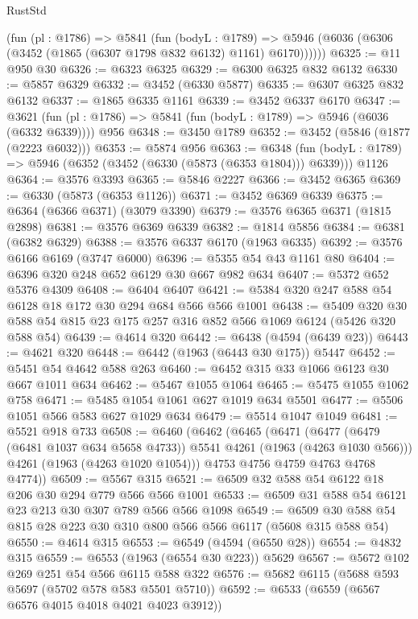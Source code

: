 \begin{lexlean}{RustStd}
\begin{coremodule}
      (fun (pl : @1786) =>
      @5841
        (fun (bodyL : @1789) =>
        @5946 (@6036 (@6306 (@3452 (@1865 (@6307 @1798 @832 @6132) @1161) @6170))))))
@6325 := @11 @950 @30
@6326 := @6323 @6325
@6329 := @6300 @6325 @832 @6132
@6330 := @5857 @6329
@6332 := @3452 (@6330 @5877)
@6335 := @6307 @6325 @832 @6132
@6337 := @1865 @6335 @1161
@6339 := @3452 @6337 @6170
@6347 := @3621 (fun (pl : @1786) => @5841 (fun (bodyL : @1789) => @5946 (@6036 (@6332 @6339)))) @956
@6348 := @3450 @1789
@6352 := @3452 (@5846 (@1877 (@2223 @6032)))
@6353 := @5874 @956
@6363 := @6348
    (fun (bodyL : @1789) => @5946 (@6352 (@3452 (@6330 (@5873 (@6353 @1804))) @6339)))
    @1126
@6364 := @3576 @3393
@6365 := @5846 @2227
@6366 := @3452 @6365
@6369 := @6330 (@5873 (@6353 @1126))
@6371 := @3452 @6369 @6339
@6375 := @6364 (@6366 @6371) (@3079 @3390)
@6379 := @3576 @6365 @6371 (@1815 @2898)
@6381 := @3576 @6369 @6339
@6382 := @1814 @5856
@6384 := @6381 (@6382 @6329)
@6388 := @3576 @6337 @6170 (@1963 @6335)
@6392 := @3576 @6166 @6169 (@3747 @6000)
@6396 := @5355 @54 @43 @1161 @80
@6404 := @6396 @320 @248 @652 @6129 @30 @667 @982 @634
@6407 := @5372 @652 @5376 @4309
@6408 := @6404 @6407
@6421 := @5384 @320 @247 @588 @54 @6128 @18 @172 @30 @294 @684 @566 @566 @1001
@6438 := @5409 @320 @30 @588 @54 @815 @23 @175 @257 @316 @852 @566 @1069 @6124 (@5426 @320 @588 @54)
@6439 := @4614 @320
@6442 := @6438 (@4594 (@6439 @23))
@6443 := @4621 @320
@6448 := @6442 (@1963 (@6443 @30 @175)) @5447
@6452 := @5451 @54 @4642 @588 @263
@6460 := @6452 @315 @33 @1066 @6123 @30 @667 @1011 @634
@6462 := @5467 @1055 @1064
@6465 := @5475 @1055 @1062 @758
@6471 := @5485 @1054 @1061 @627 @1019 @634 @5501
@6477 := @5506 @1051 @566 @583 @627 @1029 @634
@6479 := @5514 @1047 @1049
@6481 := @5521 @918 @733
@6508 := @6460
    (@6462
      (@6465
        (@6471
          (@6477 (@6479 (@6481 @1037 @634 @5658 @4733)) @5541 @4261 (@1963 (@4263 @1030 @566)))
          @4261
          (@1963 (@4263 @1020 @1054)))
        @4753
        @4756
        @4759
        @4763
        @4768
        @4774))
@6509 := @5567 @315
@6521 := @6509 @32 @588 @54 @6122 @18 @206 @30 @294 @779 @566 @566 @1001
@6533 := @6509 @31 @588 @54 @6121 @23 @213 @30 @307 @789 @566 @566 @1098
@6549 := @6509 @30 @588 @54 @815 @28 @223 @30 @310 @800 @566 @566 @6117 (@5608 @315 @588 @54)
@6550 := @4614 @315
@6553 := @6549 (@4594 (@6550 @28))
@6554 := @4832 @315
@6559 := @6553 (@1963 (@6554 @30 @223)) @5629
@6567 := @5672 @102 @269 @251 @54 @566 @6115 @588 @322
@6576 := @5682 @6115 (@5688 @593 @5697 (@5702 @578 @583 @5501 @5710))
@6592 := @6533
    (@6559 (@6567 @6576 @4015 @4018 @4021 @4023 @3912))

\end{coremodule}
\end{lexlean}
